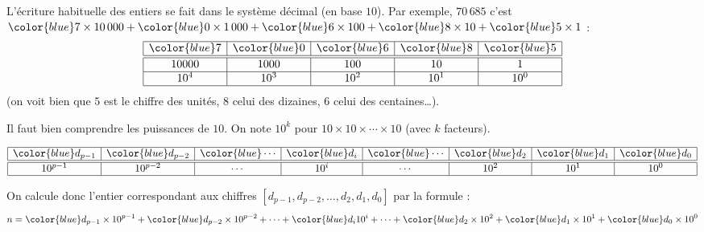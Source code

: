 \documentclass[11pt,class=report,crop=false]{standalone}
\begin{document}
\begin{cours}


L'écriture habituelle des entiers se fait dans le système décimal (en base $10$). Par exemple, $70\,685$ c'est 
${\color{blue}7} \times 10\,000
+{\color{blue}0} \times 1\,000
+{\color{blue}6} \times 100
+{\color{blue}8} \times 10 
+{\color{blue}5} \times 1$ : 
$$
\begin{array}{|c|c|c|c|c|}
  \hline
  {\color{blue}7} & {\color{blue}0} & {\color{blue}6} & {\color{blue}8} & {\color{blue}5} \\ 
  \hline\hline
  10000 & 1000 & 100 & 10 & 1 \\\hline
  10^4 & 10^3 & 10^2 & 10^1 & 10^0 \\
  \hline
\end{array}
$$   
(on voit bien que $5$ est le chiffre des unités, $8$ celui des dizaines, $6$ celui des centaines\ldots). 

Il faut bien comprendre les puissances de $10$. On note $10^k$ pour $10 \times 10 \times \cdots \times 10$ (avec $k$ facteurs).

$$
\begin{array}{|c|c|c|c|c|c|c|c|}
  \hline
  {\color{blue}d_{p-1}} & {\color{blue}d_{p-2}}& {\color{blue}\cdots} & {\color{blue}d_i}& {\color{blue}\cdots} & {\color{blue}d_2} & {\color{blue}d_1} & {\color{blue}d_0} \\ 
  \hline\hline
  10^{p-1} & 10^{p-2} & \cdots & 10^i &\cdots & 10^2 & 10^1 & 10^0 \\
  \hline
\end{array}
$$   
  
On calcule donc l'entier correspondant aux chiffres $[d_{p-1},d_{p-2}, \ldots,d_2,d_1,d_0]$ par la formule :
$$n = {\color{blue}d_{p-1}} \times 10^{p-1} + {\color{blue}d_{p-2}} \times 10^{p-2} + \cdots + {\color{blue}d_i} 10^{i} +  \cdots + {\color{blue}d_2} \times 10^2 + {\color{blue}d_1} \times 10^1 + {\color{blue}d_0} \times 10^0$$
\end{cours}

\end{document}
